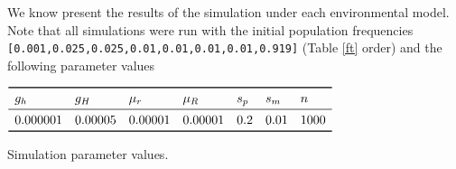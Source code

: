 We know present the results of the simulation under each environmental model.
Note that all simulations were run with the initial population frequencies \verb|[0.001,0.025,0.025,0.01,0.01,0.01,0.01,0.919]| (Table \ref{ft} order) and the following parameter values
\begin{table}[H]
    \centering
    $\begin{array}{lllllll}
        \toprule
        g_h & g_H & \mu_r & \mu_R & s_p & s_m & n  \\
        \midrule
        0.000001 & 0.00005 & 0.00001 & 0.00001 & 0.2 & 0.01 & 1000 \\
        \bottomrule
    \end{array}$
    \caption{Simulation parameter values.}
\end{table}
\FloatBarrier

